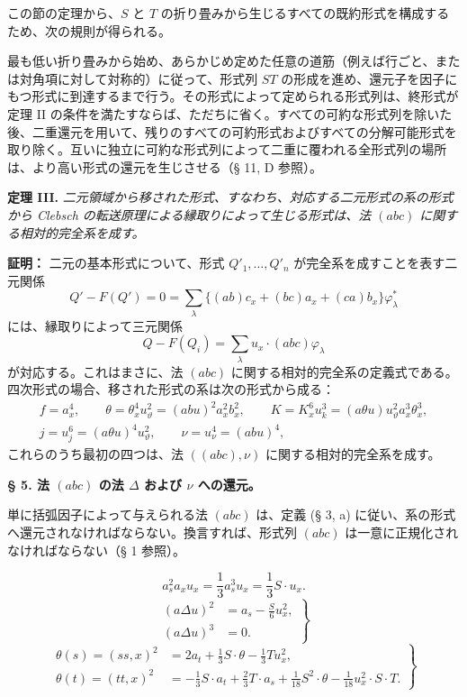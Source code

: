 \documentclass[11pt]{jlreq}
\newcommand{\A}{\Delta}
\begin{document}
この節の定理から、$S$ と $T$ の折り畳みから生じるすべての既約形式を構成するため、次の規則が得られる。

最も低い折り畳みから始め、あらかじめ定めた任意の道筋（例えば行ごと、または対角項に対して対称的）に従って、形式列 $ST$ の形成を進め、還元子を因子にもつ形式に到達するまで行う。その形式によって定められる形式列は、終形式が定理 II の条件を満たすならば、ただちに省く。すべての可約な形式列を除いた後、二重還元を用いて、残りのすべての可約形式およびすべての分解可能形式を取り除く。互いに独立に可約な形式列によって二重に覆われる全形式列の場所は、より高い形式の還元を生じさせる（§ 11, D 参照）。

\clearpage
\noindent\textbf{定理 III.}
\emph{二元領域から移された形式、すなわち、対応する二元形式の系の形式から Clebsch の転送原理による縁取りによって生じる形式は、法 $(abc)$ に関する相対的完全系を成す。}

\noindent\textbf{証明：}
二元の基本形式について、形式 $Q'_1,\ldots,Q'_n$ が完全系を成すことを表す二元関係
\[
Q'-F(Q')=0=\sum_\lambda\bigl\{(ab)c_x+(bc)a_x+(ca)b_x\bigr\}\varphi_\lambda^{*}
\]
には、縁取りによって三元関係
\[
Q-F(Q_i)=\sum_\lambda u_x\cdot(abc)\varphi_\lambda
\]
が対応する。これはまさに、法 $(abc)$ に関する相対的完全系の定義式である。四次形式の場合、移された形式の系は次の形式から成る：
\[
\begin{gathered}
f=a_x^4,\qquad
\theta=\theta_x^4u_\vartheta^2=(abu)^2a_x^2b_x^2,\qquad
K=K_x^6u_k^3=(a\theta u)u_\vartheta^2a_x^3\theta_x^3,\\
j=u_j^6=(a\theta u)^4u_\vartheta^2,\qquad
\nu=u_\nu^4=(abu)^4,
\end{gathered}
\]
これらのうち最初の四つは、法 $((abc),\nu)$ に関する相対的完全系を成す。

\begin{center}
\textbf{§ 5. \quad 法 $(abc)$ の法 $\A$ および $\nu$ への還元。}
\end{center}

単に括弧因子によって与えられる法 $(abc)$ は、定義 (§ 3, a) に従い、系の形式へ還元されなければならない。換言すれば、形式列 $(abc)$ は一意に正規化されなければならない（§ 1 参照）。

\[
a_s^2a_xu_x=\frac13 a_s^3u_x=\frac13 S\cdot u_x. \tag{2}
\]
\[
\left.
\begin{aligned}
(a\A u)^2&=a_s-\frac{S}{6}u_x^2,\\
(a\A u)^3&=0.
\end{aligned}
\right\} \tag{3}
\]
\[
\left.
\begin{aligned}
\theta(s)=(ss,x)^2&=2a_t+\frac13 S\cdot\theta-\frac13 Tu_x^2,\\
\theta(t)=(tt,x)^2&=-\frac13 S\cdot a_t+\frac23 T\cdot a_s+\frac1{18}S^2\cdot\theta-\frac1{18}u_x^2\cdot S\cdot T.
\end{aligned}
\right\} \tag{4}
\]
\end{document}
